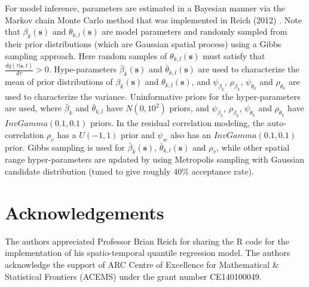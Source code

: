 \documentclass[fleqn,10pt]{wlscirep}
\newcommand{\bs}{\mathbf{s}}
\begin{document}
\bigskip

For model inference,  parameters are estimated in a Bayesian manner via the Markov chain Monte Carlo method that was implemented in Reich (2012) \cite{Brian2013}. Note that $\beta_k(\bs)$ and $\theta_{k,l}(\bs)$ are model parameters and randomly sampled from their prior distributions (which are Gaussian spatial process) using a Gibbs sampling approach. Here random samples of $\theta_{k,l}(\bs)$ must satisfy that $\frac{d q(\tau|\bs,t)}{d \tau}>0$.   Hype-parameters $\bar{\beta}_k(\bs)$ and $\bar{\theta}_{k,l}(\bs)$ are used to characterize the mean of prior distributions of $\beta_k(\bs)$ and $\theta_{k,l}(\bs)$, and
 $\psi_{\beta_k}$, $\rho_{\beta_k}$, $\psi_{\theta_{k}}$ and $\rho_{\theta_k}$ are used to characterize the variance. Uninformative priors for the hyper-parameters are used, where $\bar{\beta}_k$ and $\bar{\theta}_{k,l}$ have $N(0,10^2)$ priors, and $\psi_{\beta_k}$, $\rho_{\beta_k}$, $\psi_{\theta_{k}}$ and $\rho_{\theta_k}$ have $InvGamma(0.1,0.1)$ priors. In the residual correlation modeling, the auto-correlation $\rho_v$ has a $U(-1,1)$ prior and $\psi_w$ also has an $InvGamma(0.1,0.1)$ prior. Gibbs sampling is used for $\bar{\beta}_k(\bs)$, $\bar{\theta}_{k,l}(\bs)$ and $\rho_v$, while other spatial range hyper-parameters are updated by using Metropolis sampling with Gaussian candidate distribution (tuned to give roughly 40\% acceptance rate).


\section*{Acknowledgements}
The authors appreciated Professor Brian Reich for sharing the R code for the implementation of his spatio-temporal quantile regression model. The authors acknowledge the support of  ARC Centre of Excellence for Mathematical \& Statistical Frontiers (ACEMS) under the grant number CE140100049.
\end{document}
